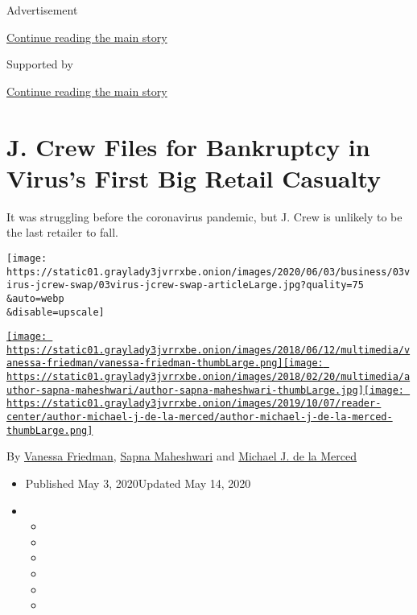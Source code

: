 Advertisement

\protect\hyperlink{after-top}{Continue reading the main story}

Supported by

\protect\hyperlink{after-sponsor}{Continue reading the main story}

\hypertarget{j-crew-files-for-bankruptcy-in-viruss-first-big-retail-casualty}{%
\section{J. Crew Files for Bankruptcy in Virus's First Big Retail
Casualty}\label{j-crew-files-for-bankruptcy-in-viruss-first-big-retail-casualty}}

It was struggling before the coronavirus pandemic, but J. Crew is
unlikely to be the last retailer to fall.

\texttt{[image: https://static01.graylady3jvrrxbe.onion/images/2020/06/03/business/03virus-jcrew-swap/03virus-jcrew-swap-articleLarge.jpg?quality=75\\\&auto=webp\\\&disable=upscale]}

\href{https://www.nytimes3xbfgragh.onion/by/vanessa-friedman}{\texttt{[image: https://static01.graylady3jvrrxbe.onion/images/2018/06/12/multimedia/vanessa-friedman/vanessa-friedman-thumbLarge.png]}}\href{https://www.nytimes3xbfgragh.onion/by/sapna-maheshwari}{\texttt{[image: https://static01.graylady3jvrrxbe.onion/images/2018/02/20/multimedia/author-sapna-maheshwari/author-sapna-maheshwari-thumbLarge.jpg]}}\href{https://www.nytimes3xbfgragh.onion/by/michael-j-de-la-merced}{\texttt{[image: https://static01.graylady3jvrrxbe.onion/images/2019/10/07/reader-center/author-michael-j-de-la-merced/author-michael-j-de-la-merced-thumbLarge.png]}}

By \href{https://www.nytimes3xbfgragh.onion/by/vanessa-friedman}{Vanessa
Friedman},
\href{https://www.nytimes3xbfgragh.onion/by/sapna-maheshwari}{Sapna
Maheshwari} and
\href{https://www.nytimes3xbfgragh.onion/by/michael-j-de-la-merced}{Michael
J. de la Merced}

\begin{itemize}
\item
  Published May 3, 2020Updated May 14, 2020
\item
  \begin{itemize}
  \item
  \item
  \item
  \item
  \item
  \item
  \end{itemize}
\end{itemize}

